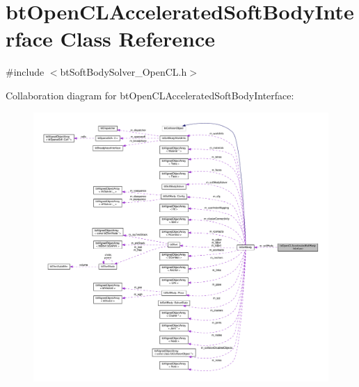 \hypertarget{classbtOpenCLAcceleratedSoftBodyInterface}{}\section{bt\+Open\+C\+L\+Accelerated\+Soft\+Body\+Interface Class Reference}
\label{classbtOpenCLAcceleratedSoftBodyInterface}


{\ttfamily \#include $<$bt\+Soft\+Body\+Solver\+\_\+\+Open\+C\+L.\+h$>$}



Collaboration diagram for bt\+Open\+C\+L\+Accelerated\+Soft\+Body\+Interface\+:
\nopagebreak
\begin{figure}[H]
\begin{center}
\leavevmode
\includegraphics[width=350pt]{classbtOpenCLAcceleratedSoftBodyInterface__coll__graph}
\end{center}
\end{figure}

